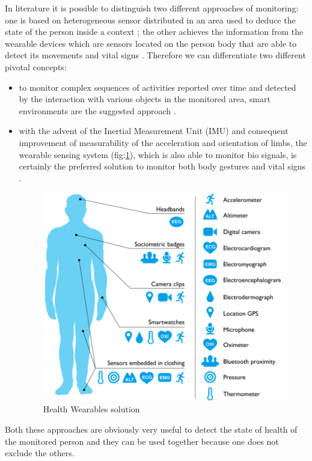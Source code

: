 \documentclass{thesisreport}
\begin{document}
 In literature it is possible to distinguish two different approaches of monitoring: one is based on heterogeneous sensor distributed in an area used to deduce the state of the person inside a context \cite{aggarwal2011human}; the other achieves the information from the wearable devices which are sensors located on the person body that are able to detect its movements and vital signs \cite{bao2004activity}. 
 Therefore we can differentiate two different pivotal concepts:
 \begin{itemize}
    \item to monitor complex sequences of activities reported over time and detected by the interaction with various objects in the monitored area, smart environments are the suggested approach \cite{scalmato2012describing}.
    \item with the advent of the Inertial Measurement Unit (IMU) and consequent improvement of measurability of the acceleration and orientation of limbs, the wearable sensing system (fig:\ref{fig:Wearables}), which is also able to monitor bio signals, is certainly the preferred solution to monitor both body gestures and vital signs \cite{bruno2013analysis}.
    
    \begin{figure}
		\centering
		\includegraphics[width=10.5cm]{Thesis/data/sensoring.png}
		\caption{Health Wearables solution \cite{Wearables2016rise}}
		\label{fig:Wearables}
	\end{figure}
    
\end{itemize}
 
 
 
Both these approaches are obviously very useful to detect the state of health of the monitored person and they can be used together because one does not exclude the others. 
\end{document}
